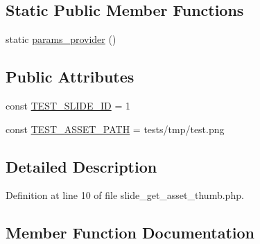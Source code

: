 \subsection*{Static Public Member Functions}
\begin{DoxyCompactItemize}
\item 
static \hyperlink{classlibresignage_1_1tests_1_1api_1_1endpoint_1_1slide_1_1asset_1_1slide__get__asset__thumb_a4dbec71a6a35c10d5f8acc09f9ee73a8}{params\+\_\+provider} ()
\end{DoxyCompactItemize}
\subsection*{Public Attributes}
\begin{DoxyCompactItemize}
\item 
const \hyperlink{classlibresignage_1_1tests_1_1api_1_1endpoint_1_1slide_1_1asset_1_1slide__get__asset__thumb_aa51a6a5e955e2cf1f8b9b914464cd7a9}{T\+E\+S\+T\+\_\+\+S\+L\+I\+D\+E\+\_\+\+ID} = \textquotesingle{}1\textquotesingle{}
\item 
const \hyperlink{classlibresignage_1_1tests_1_1api_1_1endpoint_1_1slide_1_1asset_1_1slide__get__asset__thumb_aabe221203d6ee094cbe26aae7352b967}{T\+E\+S\+T\+\_\+\+A\+S\+S\+E\+T\+\_\+\+P\+A\+TH} = \textquotesingle{}tests/tmp/test.\+png\textquotesingle{}
\end{DoxyCompactItemize}


\subsection{Detailed Description}


Definition at line 10 of file slide\+\_\+get\+\_\+asset\+\_\+thumb.\+php.



\subsection{Member Function Documentation}
\mbox{\label{classlibresignage_1_1tests_1_1api_1_1endpoint_1_1slide_1_1asset_1_1slide__get__asset__thumb_a4dbec71a6a35c10d5f8acc09f9ee73a8}} 
